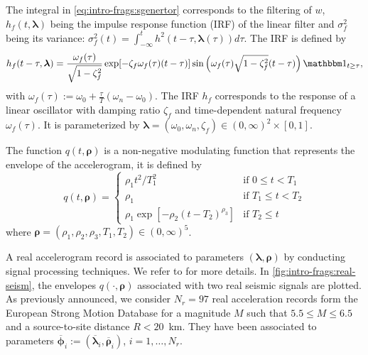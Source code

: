 
The integral in \cref{eq:intro-frags:sgenertor} corresponds to the filtering of $w$, $h_f(t,\boldsymbol{\lambda})$ being the impulse response function (IRF) of the linear filter and $\sigma_f^2$ being its variance: $\sigma_f^2(t)=\int_{-\infty}^th^2(t-\tau,\boldsymbol{\lambda}(\tau))d\tau$. The IRF is defined by
    \begin{equation}
        h_f(t-\tau,\boldsymbol{\lambda}) = \frac{\omega_f(\tau)}{\sqrt{1-\zeta^2_f}}\exp[-\zeta_f\omega_f(\tau)(t-\tau)]\sin\left(\omega_f(\tau)\sqrt{1-\zeta^2_f}(t-\tau)\right)\indic_{t\geq\tau},
    \end{equation}
with $\omega_f(\tau):=\omega_0+\frac{\tau}{T}(\omega_n-\omega_0)$. 
The IRF $h_f$ corresponds to the response of a linear oscillator with damping ratio $\zeta_f$ and time-dependent natural frequency $\omega_f(\tau)$. It is parameterized by $\boldsymbol{\lambda}=(\omega_0,\omega_n,\zeta_f)\in(0,\infty)^2\times[0,1]$.





 The function $q(t,\boldsymbol\rho)$ is a
 non-negative modulating function that represents the envelope of the accelerogram, it is defined by
    \begin{equation}
        q(t,\boldsymbol\rho) = \left\lbrace \begin{array}{ll}
            \rho_1t^2/T_1^2 & \text{if\ } 0\leq t< T_1 \\
            \rho_1 & \text{if\ }T_1\leq t< T_2\\
            \rho_1\exp\left[-\rho_2(t-T_2)^{\rho_3}\right] &\text{if\ }T_2\leq t
        \end{array}\right.
    \end{equation}
where $\boldsymbol\rho=(\rho_1,\rho_2,\rho_3,T_1,T_2)\in(0,\infty)^5$.


A real accelerogram record is associated to parameters $(\boldsymbol{\lambda},\boldsymbol{\rho})$ by conducting signal processing techniques. We refer to \cite{rezaeian_stochastic_2008} for more details.
In \cref{fig:intro-frags:real-seism}, the envelopes $q(\cdot,\boldsymbol{\rho})$ associated with two real seismic signals are plotted.
As previously announced,
we consider $N_r=97$ real acceleration records form the European Strong Motion Database for a magnitude $M$ such that $5.5\leq M\leq 6.5$ and a source-to-site distance $R<20$~km. They have been associated to parameters $\overline{\boldsymbol{\phi}}_i:=(\overline{\boldsymbol{\lambda}}_i,\overline{\boldsymbol{\rho}}_i)$, $i=1,\dots,N_r$.



